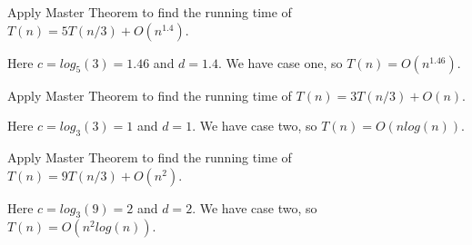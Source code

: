 \documentclass[12pt]{article}
\begin{document}
\begin{question}
Apply Master Theorem to find the running time of $T(n) = 5T(n/3) + O(n^{1.4})$.
\end{question}

\begin{solution}
Here $c = log_{5}(3) = 1.46$ and $d = 1.4$. We have case one, so $T(n) = O(n^{1.46})$.
\end{solution}

\begin{question}
Apply Master Theorem to find the running time of $T(n) = 3T(n/3) + O(n)$.
\end{question}

\begin{solution}
Here $c = log_{3}(3) = 1$ and $d = 1$. We have case two, so $T(n) = O(nlog(n))$.
\end{solution}

\begin{question}
Apply Master Theorem to find the running time of $T(n) = 9T(n/3) + O(n^2)$.
\end{question}

\begin{solution}
Here $c = log_{3}(9) = 2$ and $d = 2$. We have case two, so $T(n) = O(n^2log(n))$.
\end{solution}
\end{document}
